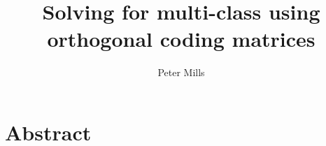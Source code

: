 \documentclass{article}
\title{Solving for multi-class using orthogonal coding matrices}
\author{Peter Mills}
\begin{document}
\maketitle

\section*{Abstract}






\end{document}
